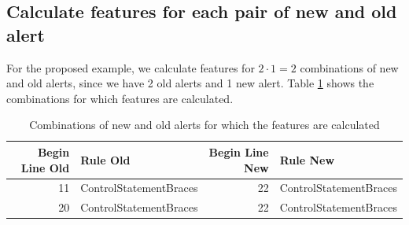 \documentclass[
]{article}
\begin{document}
\small

\begin{table}[H]

\caption{\label{tab:showing map }Relation between lines of the old version and lines of the new version\label{table_map}}
\centering
{}
\end{table}

\normalsize

\subsection{Calculate features for each pair of new and old alert}

For the proposed example, we calculate features for \(2 \cdot 1 = 2\)
combinations of new and old alerts, since we have 2 old alerts and 1 new
alert. Table \ref{combination} shows the combinations for which features
are calculated.

\small

\begin{table}[H]

\caption{\label{tab:unnamed-chunk-6}Combinations of new and old alerts for which the features are calculated \label{combination}}
\centering
\begin{tabular}[t]{r|l|r|l}
\hline
Begin Line Old & Rule Old & Begin Line New & Rule New\\
\hline
11 & ControlStatementBraces & 22 & ControlStatementBraces\\
\hline
20 & ControlStatementBraces & 22 & ControlStatementBraces\\
\hline
\end{tabular}
\end{table}

\normalsize

\end{document}
